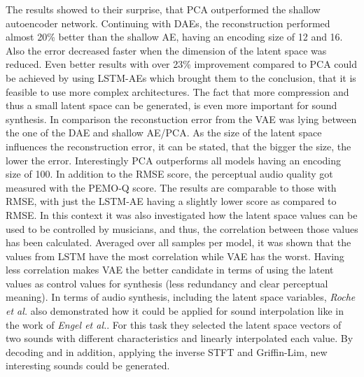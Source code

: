 The results showed to their surprise, that PCA outperformed the shallow autoencoder network. Continuing with DAEs, the reconstruction performed almost 20\% better than the shallow AE, having an encoding size of 12 and 16. Also the error decreased faster when the dimension of the latent space was reduced. Even better results with over 23\% improvement compared to PCA could be achieved by using LSTM-AEs which brought them to the conclusion, that it is feasible to use more complex architectures. The fact that more compression and thus a small latent space can be generated, is even more important for sound synthesis. In comparison the reconstuction error from the VAE was lying between the one of the DAE and shallow AE/PCA. As the size of the latent space influences the reconstruction error, it can be stated, that the bigger the size, the lower the error. Interestingly PCA outperforms all models having an encoding size of 100. In addition to the RMSE score, the perceptual audio quality got measured with the PEMO-Q score. The results are comparable to those with RMSE, with just the LSTM-AE having a slightly lower score as compared to RMSE. In this context it was also investigated how the latent space values can be used to be controlled by musicians, and thus, the correlation between those values has been calculated. Averaged over all samples per model, it was shown that the values from LSTM have the most correlation while VAE has the worst. Having less correlation makes VAE the better candidate in terms of using the latent values as control values for synthesis (less redundancy and clear perceptual meaning). In terms of audio synthesis, including the latent space variables, \textit{Roche et al.} also demonstrated how it could be applied for sound interpolation like in the work of \textit{Engel et al.}. For this task they selected the latent space vectors of two sounds with different characteristics and linearly interpolated each value. By decoding and in addition, applying the inverse STFT and Griffin-Lim, new interesting sounds could be generated. 

